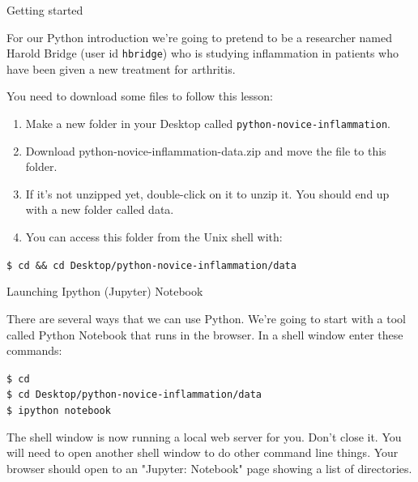 \documentclass{beamer}
\begin{document}
\begin{frame}{Getting started}

\small{For our Python introduction we're going to pretend to be a researcher named Harold Bridge (user id \texttt{hbridge}) who is studying inflammation in patients who have been given a new treatment for arthritis.}
\vspace{0.5cm}

You need to download some files to follow this lesson:
\begin{enumerate}
 \item{Make a new folder in your Desktop called \texttt{python-novice-inflammation}.}
    \item{Download python-novice-inflammation-data.zip and move the file to this folder.}
    \item{If it's not unzipped yet, double-click on it to unzip it. You should end up with a new folder called data.}
   \item{You can access this folder from the Unix shell with:}
\end{enumerate}
\texttt{\$ cd \&\& cd Desktop/python-novice-inflammation/data}




\end{frame}


\begin{frame}{Launching Ipython (Jupyter) Notebook}

\small{There are several ways that we can use Python.  We're going to start with
a tool called Python Notebook that runs in the browser.
In a shell window enter these commands:}

\vspace{0.5cm}

\begin{beamerboxesrounded}[upper=uppercolgreen,lower=lowercolgreen,shadow=false]{}
\texttt{\$ cd \\
\$ cd Desktop/python-novice-inflammation/data \\
\$ ipython notebook}
\end{beamerboxesrounded}
\vspace{0.5cm}

\small{The shell window is now running a local web server for you.  Don't close it. You will need to open another shell window to do other command line things. Your browser should open to an "Jupyter:  Notebook" page showing a list of directories.}
\end{frame}
\end{document}

